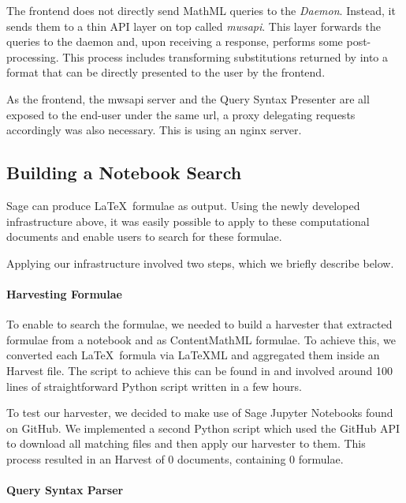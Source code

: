 The frontend does not directly send MathML queries to the \textit{Daemon}.
Instead, it sends them to a thin API layer on top called \textit{mwsapi}. 
This layer forwards the queries to the daemon and, upon receiving a response, performs some post-processing. 
This process includes transforming substitutions returned by \MWS into a format that can be directly presented to the user by the frontend. 

As the frontend, the mwsapi server and the Query Syntax Presenter are all exposed to the end-user under the same url, a proxy delegating requests accordingly was also necessary. 
This is using an nginx  server. 

\subsection{Building a Notebook Search}

Sage can produce \LaTeX\ formulae as output.
Using the newly developed infrastructure above, it was easily possible to apply \MWS to these computational documents and enable users to search for these formulae. 

Applying our infrastructure involved two steps, which we briefly describe below.

\paragraph{Harvesting Formulae}

To enable \MWS to search the formulae, we needed to build a harvester that extracted formulae from a notebook and as ContentMathML formulae. 
To achieve this, we converted each \LaTeX\ formula via LaTeXML and aggregated them inside an \MWS Harvest file. 
The script to achieve this can be found in  and involved around 100 lines of straightforward Python script written in a few hours. 

To test our harvester, we decided to make use of Sage Jupyter Notebooks found on GitHub. 
We implemented a second Python script which used the GitHub API to download all matching files and then apply our harvester to them. 
This process resulted in an \MWS Harvest of $0$ documents, containing $0$ formulae.

\paragraph{Query Syntax Parser}

